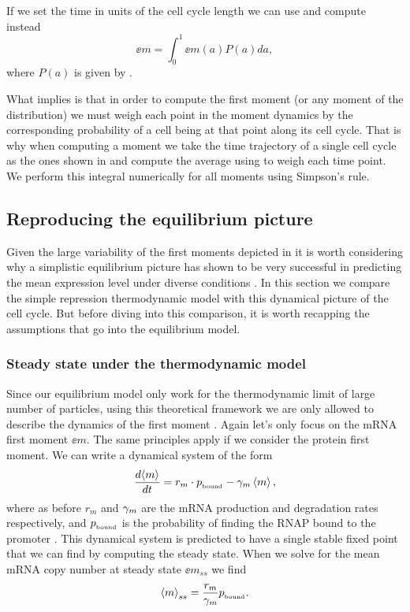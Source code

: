 If we set the time in units of the cell cycle length we can use
 and compute instead
\begin{equation}
  \ee{m} = \int_0^1 \ee{m(a)} P(a) da,
  \label{seq_moment_avg}
\end{equation}
where $P(a)$ is given by .

What  implies is that in order to compute the first moment
(or any moment of the distribution) we must weigh each point in the moment
dynamics by the corresponding probability of a cell being at that point along
its cell cycle. That is why when computing a moment we take the time trajectory
of a single cell cycle as the ones shown in  and
compute the average using  to weigh each time point. We
perform this integral numerically for all moments using Simpson's rule.

\subsection{Reproducing the equilibrium picture}

Given the large variability of the first moments depicted in
 it is worth considering why a simplistic
equilibrium picture has shown to be very successful in predicting the mean
expression level under diverse conditions \cite{Garcia2011c, Brewster2014,
Barnes2018, Razo-Mejia2018}. In this section we compare the simple repression
thermodynamic model with this dynamical picture of the cell cycle. But before
diving into this comparison, it is worth recapping the assumptions that go into
the equilibrium model.

\subsubsection{Steady state under the thermodynamic model}

Since our equilibrium model only work for the thermodynamic limit of large
number of particles, using this theoretical framework we are only allowed to
describe the dynamics of the first moment \cite{Phillips2015}.
Again let's only focus on the mRNA first moment $\ee{m}$. The same principles
apply if we consider the protein first moment. We can write a dynamical system
of the form
\begin{equation}
  {d{\left\langle m \right\rangle} \over dt} = r_m \cdot p_{_\text{bound}} - \gamma _m \left\langle m \right\rangle,
\end{equation}
where as before $r_m$ and $\gamma _m$ are the mRNA production and degradation rates
respectively, and $p_{_\text{bound}}$ is the probability of finding the RNAP bound to the
promoter \cite{Bintu2005a}. This dynamical system is predicted to have a single
stable fixed point that we can find by computing the steady state. When we solve
for the mean mRNA copy number at steady state $\ee{m}_{ss}$ we find
\begin{equation}
  \left\langle m \right\rangle_{ss} = {r_m \over \gamma _m} p_{_\text{bound}}.
\end{equation}

